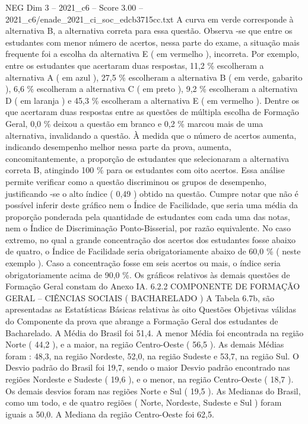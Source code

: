 \begin{textsample}{NEG Dim 3 – 2021\_c6 – Score 3.00 – 2021\_c6/enade\_2021\_ci\_soc\_edcb3715cc.txt}
A curva em verde corresponde à alternativa B, a alternativa correta para essa questão.
Observa -se que entre os estudantes com menor número de acertos, nessa parte do exame, a situação mais frequente foi a escolha da alternativa E ( em vermelho ), incorreta.
Por exemplo, entre os estudantes que acertaram duas respostas, 11,2 \% escolheram a alternativa A ( em azul ), 27,5 \% escolheram a alternativa B ( em verde, gabarito ), 6,6 \% escolheram a alternativa C ( em preto ), 9,2 \% escolheram a alternativa D ( em laranja ) e 45,3 \% escolheram a alternativa E ( em vermelho ).
Dentre os que acertaram duas respostas entre as questões de múltipla escolha de Formação Geral, 0,0 \% deixou a questão em branco e 0,2 \% marcou mais de uma alternativa, invalidando a questão.
À medida que o número de acertos aumenta, indicando desempenho melhor nessa parte da prova, aumenta, concomitantemente, a proporção de estudantes que selecionaram a alternativa correta B, atingindo 100 \% para os estudantes com oito acertos.
Essa análise permite verificar como a questão discriminou os grupos de desempenho, justificando -se o alto índice ( 0,49 ) obtido na questão.
Cumpre notar que não é possível inferir deste gráfico nem o Índice de Facilidade, que seria uma média da proporção ponderada pela quantidade de estudantes com cada uma das notas, nem o Índice de Discriminação Ponto-Bisserial, por razão equivalente.
No caso extremo, no qual a grande concentração dos acertos dos estudantes fosse abaixo de quatro, o Índice de Facilidade seria obrigatoriamente abaixo de 60,0 \% ( neste exemplo ).
Caso a concentração fosse em seis acertos ou mais, o índice seria obrigatoriamente acima de 90,0 \%.
Os gráficos relativos às demais questões de Formação Geral constam do Anexo IA. 6.2.2 COMPONENTE DE FORMAÇÃO GERAL – CIÊNCIAS SOCIAIS ( BACHARELADO ) A Tabela 6.7b, são apresentadas as Estatísticas Básicas relativas às oito Questões Objetivas válidas do Componente da prova que abrange a Formação Geral dos estudantes de Bacharelado.
A Média do Brasil foi 51,4.
A menor Média foi encontrada na região Norte ( 44,2 ), e a maior, na região Centro-Oeste ( 56,5 ).
As demais Médias foram : 48,3, na região Nordeste, 52,0, na região Sudeste e 53,7, na região Sul.
O Desvio padrão do Brasil foi 19,7, sendo o maior Desvio padrão encontrado nas regiões Nordeste e Sudeste ( 19,6 ), e o menor, na região Centro-Oeste ( 18,7 ).
Os demais desvios foram nas regiões Norte e Sul ( 19,5 ).
As Medianas do Brasil, como um todo, e de quatro regiões ( Norte, Nordeste, Sudeste e Sul ) foram iguais a 50,0.
A Mediana da região Centro-Oeste foi 62,5.

\end{textsample}
